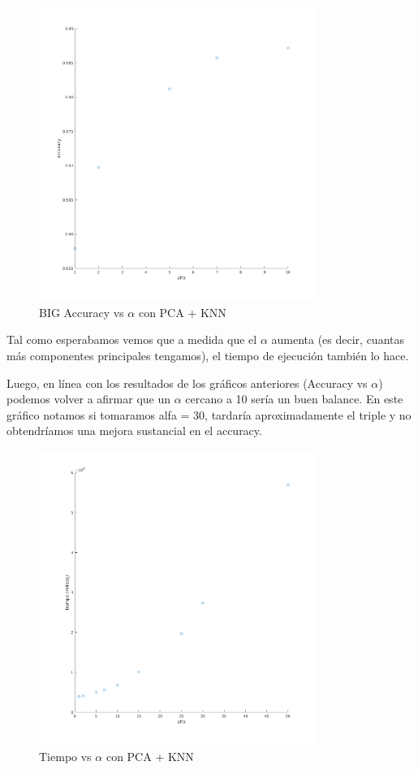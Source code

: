 \begin{figure}[H]
	\centering	\includegraphics[width=0.8\textwidth]{img/big_alfa_pca_accu.png}
	\caption{BIG Accuracy vs $\alpha$ con PCA + KNN}
	\label{fig: BIG Accuracy vs Alpha con KNN + PCA}
\end{figure}



Tal como esperabamos vemos que a medida que el $\alpha$ aumenta (es decir, cuantas más componentes principales tengamos), el tiempo de ejecución también lo hace.

Luego, en línea con los resultados de los gráficos anteriores (Accuracy vs $\alpha$) podemos volver a afirmar que un $\alpha$ cercano a 10 sería un buen balance. En este gráfico notamos si tomaramos alfa = 30, tardaría aproximadamente el triple y no obtendríamos una mejora sustancial en el accuracy.
\begin{figure}[H]
	\centering	\includegraphics[width=0.8\textwidth]{img/alfa_pca_tiempo.png}
	\caption{Tiempo vs $\alpha$ con PCA + KNN}
	\label{fig:Tiempo vs Alpha con PCA + KNN}
\end{figure}

